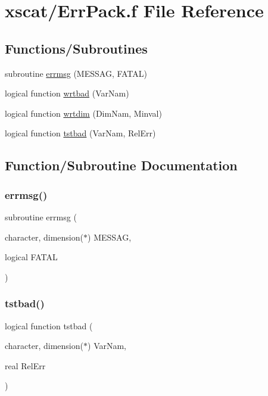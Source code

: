 \hypertarget{_err_pack_8f}{}\section{xscat/\+Err\+Pack.f File Reference}
\label{_err_pack_8f}
\subsection*{Functions/\+Subroutines}
\begin{DoxyCompactItemize}
\item 
subroutine \hyperlink{_err_pack_8f_a5b228fa8b6f6dd90e6de7beb661002ff}{errmsg} (M\+E\+S\+S\+AG, F\+A\+T\+AL)
\item 
logical function \hyperlink{_err_pack_8f_a39b9b11ebe066217c5eb36dda9009bab}{wrtbad} (Var\+Nam)
\item 
logical function \hyperlink{_err_pack_8f_ac00ea4bd5d2336abbbfaa44c3822eaad}{wrtdim} (Dim\+Nam, Minval)
\item 
logical function \hyperlink{_err_pack_8f_a17579d06a5cb7a305570f7082e20d81c}{tstbad} (Var\+Nam, Rel\+Err)
\end{DoxyCompactItemize}


\subsection{Function/\+Subroutine Documentation}
\mbox{\label{_err_pack_8f_a5b228fa8b6f6dd90e6de7beb661002ff}} 
\subsubsection{\texorpdfstring{errmsg()}{errmsg()}}
{\footnotesize\ttfamily subroutine errmsg (\begin{DoxyParamCaption}\item[{character, dimension($\ast$)}]{M\+E\+S\+S\+AG,  }\item[{logical}]{F\+A\+T\+AL }\end{DoxyParamCaption})}

\mbox{\label{_err_pack_8f_a17579d06a5cb7a305570f7082e20d81c}} 
\subsubsection{\texorpdfstring{tstbad()}{tstbad()}}
{\footnotesize\ttfamily logical function tstbad (\begin{DoxyParamCaption}\item[{character, dimension($\ast$)}]{Var\+Nam,  }\item[{real}]{Rel\+Err }\end{DoxyParamCaption})}

